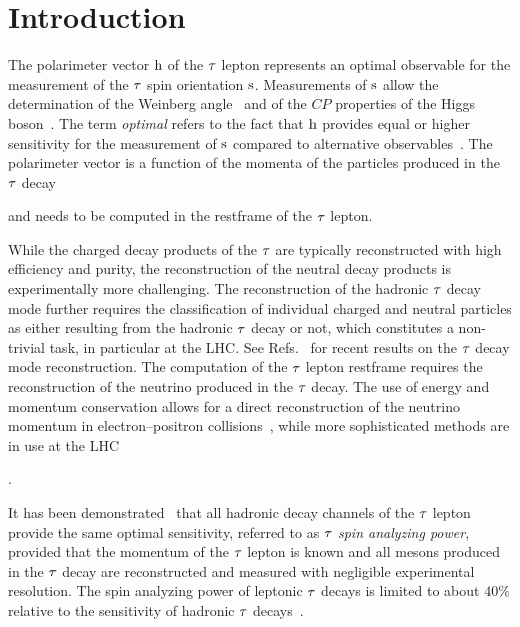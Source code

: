 \section{Introduction}
\label{sec:Introduction}

The polarimeter vector $\textrm{h}$ of the $\tau$ lepton represents an optimal observable for the measurement of the $\tau$ spin orientation $\textrm{s}$.
Measurements of $\textrm{s}$ allow the determination of the Weinberg angle~\cite{ALEPH:2001uca,DELPHI:1999yne,L3:1998oan,OPAL:2001brm,ATLAS:2017xuc,CMS:2023mgq} and of the $CP$ properties of the Higgs boson~\cite{ATLAS:2022akr,CMS:2021sdq}.
The term {\em optimal} refers to the fact that $\textrm{h}$ provides equal or higher sensitivity for the measurement of $\textrm{s}$ compared to alternative observables~\cite{Davier:1992nw}.
The polarimeter vector is a function of the momenta of the particles produced in the $\tau$ decay {\color{blue} and needs to be computed in the restframe of the $\tau$ lepton. 

While the charged decay products of the $\tau$ are typically reconstructed with high efficiency and purity, the reconstruction of the neutral decay products is experimentally more challenging. The reconstruction of the hadronic $\tau$ decay mode further requires the classification of individual charged and neutral particles as either resulting from the hadronic $\tau$ decay or not, which constitutes a non-trivial task, in particular at the LHC. See Refs.~\cite{Behnke:2013lya,Tran:2015nxa,ATLAS:2015boj,Xu:2017lgs,CMS-DP-2020-041,CMS:2022prd,Giagu:2022gmq,ATLAS:2022aip} for recent results on the $\tau$ decay mode reconstruction. The computation of the $\tau$ lepton restframe requires the reconstruction of the neutrino produced in the $\tau$ decay. The use of energy and momentum conservation allows for a direct reconstruction of the neutrino momentum in electron--positron collisions~\cite{Altakach:2022ywa,Ehataht:2023zzt}, while more sophisticated methods are in use at the LHC~\cite{Elagin:2010aw,Bianchini:2016yrt,Sauerland:1358627,Cherepanov:2018npf}}.

It has been demonstrated~\cite{Kuhn:1995nn} that all hadronic decay channels of the $\tau$ lepton provide the same optimal sensitivity, referred to as {\em $\tau$ spin analyzing power}, provided that the momentum of the $\tau$ lepton is known and all mesons produced in the $\tau$ decay are reconstructed and measured with negligible experimental resolution. The spin analyzing power of leptonic $\tau$ decays is limited to about $40\%$ relative to the sensitivity of hadronic $\tau$ decays~\cite{Davier:1992nw}.


